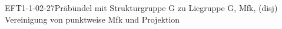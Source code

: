 
\begin{REM}{EFT1-1-02-27}{Präbündel mit Strukturgruppe G zu Liegruppe G, Mfk, (disj) Vereinigung von punktweise Mfk und Projektion}
\end{REM}
